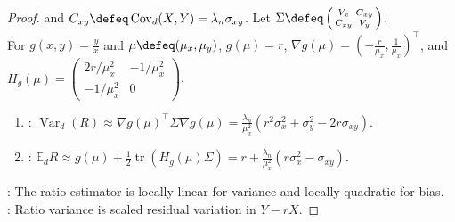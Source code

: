 \begin{theorem}
\begin{proof}
and $C_{xy}\defeq\operatorname{Cov}_d(\overline{X},\overline{Y})=\lambda_n\sigma_{xy}$. Let $\Sigma\defeq\left(\begin{smallmatrix}V_x&C_{xy}\\ C_{xy}&V_y\end{smallmatrix}\right)$.\\
For $g(x,y)=\frac{y}{x}$ and $\mu\defeq(\mu_x,\mu_y)$, $g(\mu)=r$, $\nabla g(\mu)=(-\frac r{\mu_x},\frac1{\mu_x})^{\top}$, and $H_g(\mu)=\left(\begin{smallmatrix}2r/\mu_x^2&-1/\mu_x^2\\ -1/\mu_x^2&0\end{smallmatrix}\right)$.
\begin{enumerate}[label=(\roman*)]
\setlength{\itemsep}{0pt}
\item {}: $\operatorname{Var}_d(R)\approx\nabla g(\mu)^{\top}\Sigma\nabla g(\mu)=\frac{\lambda_n}{\mu_x^2}(r^2\sigma_x^2+\sigma_y^2-2r\sigma_{xy})$.
\item {}: $\mathbb{E}_dR\approx g(\mu)+\frac12\operatorname{tr}(H_g(\mu)\Sigma)=r+\frac{\lambda_n}{\mu_x^2}(r\sigma_x^2-\sigma_{xy})$.
\end{enumerate}
: The ratio estimator is locally linear for variance and locally quadratic for bias.\\
: Ratio variance is scaled residual variation in $Y-rX$.
\end{proof}
\end{theorem}

